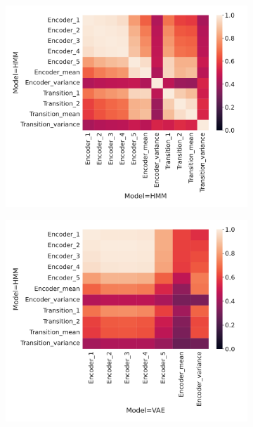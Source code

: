 \documentclass[twoside,11pt]{article}
\begin{document}
\begin{figure}[ht!]
    \centering
    \begin{subfigure}{.3\textwidth}
        \centering
        \includegraphics[draft=false,width=\linewidth]{cka_figures/CKA_hmm_1_hmm_1}
        \caption{}\label{sfig:cka-hmm-hmm}
    \end{subfigure}%
    \begin{subfigure}{.3\textwidth}
        \centering
        \includegraphics[draft=false,width=\linewidth]{cka_figures/CKA_hmm_1_vae_1}
        \caption{}\label{sfig:cka-hmm-vae}

\end{subfigure}
\end{figure}
\end{document}
